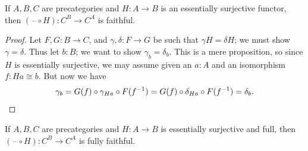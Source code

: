 \documentclass[10pt,a4paper]{article}
\newcommand{\blank}{\mathord{\hspace{1pt}\text{--}\hspace{1pt}}}
\newcommand{\inv}[1]{{#1}^{-1}}
\theoremstyle{definition}
\theoremstyle{remark}
\numberwithin{equation}{section}
\begin{document}
\begin{lem}\label{ct:esosurj-postcomp-faithful}
  If $A,B,C$ are precategories and $H:A\to B$ is an essentially surjective functor, then $(\blank\circ H):C^B \to C^A$ is faithful.
\end{lem}
\begin{proof}
  Let $F,G:B\to C$, and $\gamma,\delta:F\to G$ be such that $\gamma H = \delta H$; we must show $\gamma=\delta$.
  Thus let $b:B$; we want to show $\gamma_b=\delta_b$.
  This is a mere proposition, so since $H$ is essentially surjective, we may assume given an $a:A$ and an isomorphism $f:Ha\cong b$.
  But now we have
  \[ \gamma_b = G(f) \circ \gamma_{Ha} \circ F(\inv{f})
  = G(f) \circ \delta_{Ha} \circ F(\inv{f})
  = \delta_b.\qedhere
  \]
\end{proof}

\begin{lem}\label{ct:esofull-precomp-ff}
  If $A,B,C$ are precategories and $H:A\to B$ is essentially surjective and full, then $(\blank\circ H):C^B \to C^A$ is fully faithful.
\end{lem}
\end{document}
